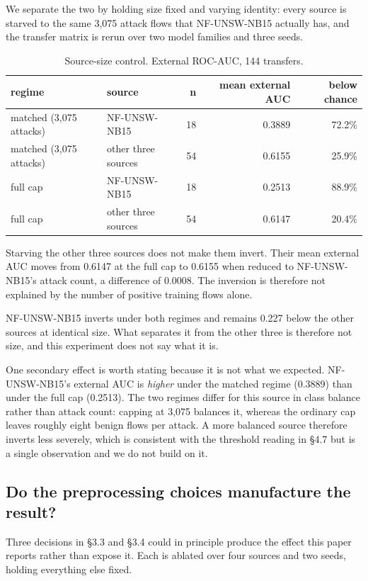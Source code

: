 \documentclass[journal]{IEEEtran}
\begin{document}
We separate the two by holding size fixed and varying identity: every source is starved to the same 3,075 attack flows that NF-UNSW-NB15 actually has, and the transfer matrix is rerun over two model families and three seeds.

\begin{table}[htbp]\centering\scriptsize
\caption{Source-size control. External ROC-AUC, 144 transfers.}
\begin{tabular}{llrrr}
\toprule
regime & source & n & mean external AUC & below chance \\
\midrule
matched (3,075 attacks) & NF-UNSW-NB15 & 18 & 0.3889 & 72.2\% \\
matched (3,075 attacks) & other three sources & 54 & 0.6155 & 25.9\% \\
full cap & NF-UNSW-NB15 & 18 & 0.2513 & 88.9\% \\
full cap & other three sources & 54 & 0.6147 & 20.4\% \\
\bottomrule
\end{tabular}
\end{table}

Starving the other three sources does not make them invert. Their mean external AUC moves from 0.6147 at the full cap to 0.6155 when reduced to NF-UNSW-NB15's attack count, a difference of 0.0008. The inversion is therefore not explained by the number of positive training flows alone.

NF-UNSW-NB15 inverts under both regimes and remains 0.227 below the other sources at identical size. What separates it from the other three is therefore not size, and this experiment does not say what it is.

One secondary effect is worth stating because it is not what we expected. NF-UNSW-NB15's external AUC is \emph{higher} under the matched regime (0.3889) than under the full cap (0.2513). The two regimes differ for this source in class balance rather than attack count: capping at 3,075 balances it, whereas the ordinary cap leaves roughly eight benign flows per attack. A more balanced source therefore inverts less severely, which is consistent with the threshold reading in §4.7 but is a single observation and we do not build on it.

\subsection{Do the preprocessing choices manufacture the result?}

Three decisions in §3.3 and §3.4 could in principle produce the effect this paper reports rather than expose it. Each is ablated over four sources and two seeds, holding everything else fixed.
\end{document}
